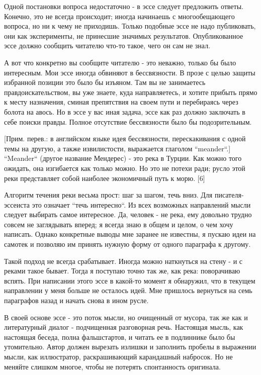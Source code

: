 \documentclass[ebook,12pt,oneside,openany]{memoir}
\begin{document}
Одной постановки вопроса недостаточно - в эссе следует предложить
ответы. Конечно, это не всегда происходит; иногда начинаешь с
многообещающего вопроса, но ни к чему не приходишь. Только подобные
эссе не надо публиковать, они как эксперименты, не принесшие значимых
результатов. Опубликованное эссе должно сообщить читателю что-то
такое, чего он сам не знал. \newline

А вот что конкретно вы сообщите читателю - это неважно, только бы было
интересным. Мои эссе иногда обвиняют в бессвязности. В прозе с целью
защиты избранной позиции это было бы изъяном. Там вы не занимаетесь
правдоискательством, вы уже знаете, куда направляетесь, и хотите
прибыть прямо к месту назначения, сминая препятствия на своем пути и
перебираясь через болота на авось. Но в эссе у вас иная задача, эссе
как раз должно заключать в себе поиски правды. Полное отсутствие
бессвязности было бы подозрительным. \newline

[Прим. перев.: в английском языке идея бессвязности, перескакивания с
одной темы на другую, а также извилистости, выражается глаголом
``meander``.] ``Meander`` (другое название Мендерес) - это река в
Турции. Как можно того ожидать, она изгибается как только можно. Но
это не потехи ради; русло этой реки представляет собой наиболее
экономичный путь к морю. [6] \newline

Алгоритм течения реки весьма прост: шаг за шагом, течь вниз. Для
писателя-эссеиста это означает ``течь интересно``. Из всех возможных
направлений мысли следует выбирать самое интересное. Да, человек - не
река, ему довольно трудно совсем не заглядывать вперед; я всегда знаю
в общем и целом, о чем хочу написать. Однако конкретные выводы мне
заранее не известны, я пускаю идеи на самотек и позволяю им принять
нужную форму от одного параграфа к другому. \newline

Такой подход не всегда срабатывает. Иногда можно наткнуться на стену -
и с реками такое бывает. Тогда я поступаю точно так же, как река:
поворачиваю вспять. При написании этого эссе в какой-то момент я
обнаружил, что в текущем направлении у меня больше не осталось идей.
Мне пришлось вернуться на семь параграфов назад и начать снова в ином
русле. \newline

В своей основе эссе - это поток мысли, но очищенный от мусора, так же
как и литературный диалог - подчищенная разговорная речь. Настоящая
мысль, как настоящая беседа, полна фальшстартов, и читать ее в
подлиннике было бы утомительно. Автор должен вырезать излишки и
заполнить пробелы в выражении мысли, как иллюстратор, раскрашивающий
карандашный набросок. Но не меняйте слишком многое, чтобы не потерять
спонтанность оригинала. \newline
\end{document}
